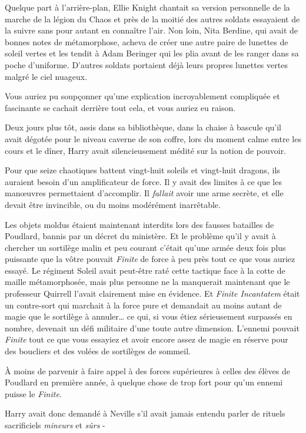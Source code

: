 Quelque part à l'arrière-plan, Ellie Knight chantait sa version personnelle de la marche de la légion du Chaos et près de la moitié des autres soldats essayaient de la suivre sans pour autant en connaître l'air. Non loin, Nita Berdine, qui avait de bonnes notes de métamorphose, acheva de créer une autre paire de lunettes de soleil vertes et les tendit à Adam Beringer qui les plia avant de les ranger dans sa poche d'uniforme. D'autres soldats portaient déjà leurs propres lunettes vertes malgré le ciel nuageux.

Vous auriez pu soupçonner qu'une explication incroyablement compliquée et fascinante se cachait derrière tout cela, et vous auriez eu raison.

Deux jours plus tôt, assis dans sa bibliothèque, dans la chaise à bascule qu'il avait dégotée pour le niveau caverne de son coffre, lors du moment calme entre les cours et le dîner, Harry avait silencieusement médité sur la notion de pouvoir.

Pour que seize chaotiques battent vingt-huit soleils et vingt-huit dragons, ils auraient besoin d'un amplificateur de force. Il y avait des limites à ce que les manœuvres permettaient d'accomplir. Il \emph{fallait} avoir une arme secrète, et elle devait être invincible, ou du moins modérément inarrêtable.

Les objets moldus étaient maintenant interdits lors des fausses batailles de Poudlard, bannis par un décret du ministère. Et le problème qu'il y avait à chercher un sortilège malin et peu courant c'était qu'une armée deux fois plus puissante que la vôtre pouvait \emph{Finite} de force à peu près tout ce que vous auriez essayé. Le régiment Soleil avait peut-être raté cette tactique face à la cotte de maille métamorphosée, mais plus personne ne la manquerait maintenant que le professeur Quirrell l'avait clairement mise en évidence. Et \emph{Finite Incantatem} était un contre-sort qui marchait à la force pure et demandait au moins autant de magie que le sortilège à annuler… ce qui, si vous étiez sérieusement surpassés en nombre, devenait un défi militaire d'une toute autre dimension. L'ennemi pouvait \emph{Finite} tout ce que vous essayiez et avoir encore assez de magie en réserve pour des boucliers et des volées de sortilèges de sommeil.

À moins de parvenir à faire appel à des forces supérieures à celles des élèves de Poudlard en première année, à quelque chose de trop fort pour qu'un ennemi puisse le \emph{Finite}.

Harry avait donc demandé à Neville s'il avait jamais entendu parler de rituels sacrificiels \emph{mineurs} et \emph{sûrs} -

